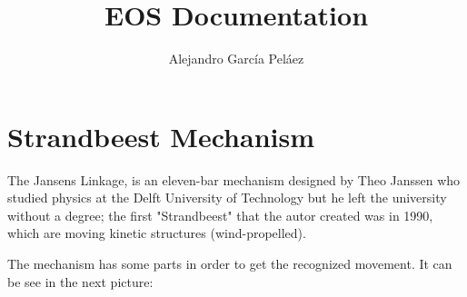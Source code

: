 \documentclass[11pt,a4paper]{article}
\author{Alejandro García Peláez}
\title{EOS Documentation}
\begin{document}
\maketitle 
\break

\section*{Strandbeest Mechanism}

The Jansens Linkage, is an eleven-bar mechanism designed by Theo Janssen who studied physics at the Delft University of Technology but he left the university without a degree; the first "Strandbeest" that the autor created was in 1990, which are moving kinetic structures (wind-propelled).

\noindent\newline The mechanism has some parts in order to get the recognized movement. It can be see in the next picture:
\end{document}
